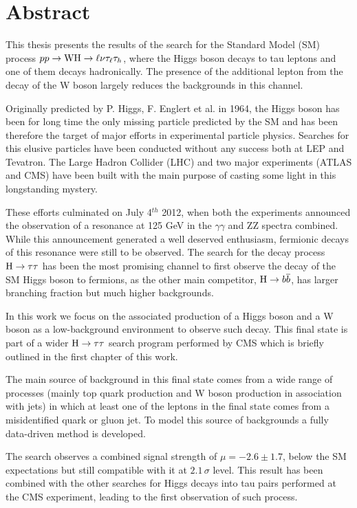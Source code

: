 \chapter*{Abstract}

This thesis presents the results of the search for the Standard Model (SM) process $pp \rightarrow \mathrm{W}\mathrm{H} \rightarrow \ell \nu \tau_\ell \tau_h$, where the Higgs boson decays to tau leptons and one of them decays hadronically. The presence of the additional lepton from the decay of the W boson largely reduces the backgrounds in this channel.

Originally predicted by P. Higgs, F. Englert et al. in 1964, the Higgs boson has been for long time the only missing particle predicted by the SM and has been therefore the target of major efforts in experimental particle physics. Searches for this elusive particles have been conducted without any success both at LEP and Tevatron. The Large Hadron Collider (LHC) and two major experiments (ATLAS and CMS) have been built with the main purpose of casting some light in this longstanding mystery. 

These efforts culminated on July 4$^{th}$ 2012, when both the experiments announced the observation of a resonance at 125 GeV in the $\gamma \gamma$ and ZZ spectra combined. While this announcement generated a well deserved enthusiasm, fermionic decays of this resonance were still to be observed. The search for the decay process $\mathrm{H} \rightarrow \tau \tau$ has been the most promising channel to first observe the decay of the SM Higgs boson to fermions, as the other main competitor, $\mathrm{H} \rightarrow b\overline{b}$, has larger branching fraction but much higher backgrounds. 

In this work we focus on the associated production of a Higgs boson and a W boson as a low-background environment to observe such decay. This final state is part of a wider $\mathrm{H} \rightarrow \tau \tau$ search program performed by CMS which is briefly outlined in the first chapter of this work. 

The main source of background in this final state comes from a wide range of processes (mainly top quark production and W boson production in association with jets) in which at least one of the leptons in the final state comes from a misidentified quark or gluon jet. To model this source of backgrounds a fully data-driven method %
is developed.

The search observes a combined signal strength of $\mu = -2.6\pm1.7$,  below the SM expectations but still compatible with it at $2.1\,\sigma$ level. This result has been combined with the other searches for Higgs decays into tau pairs performed at the CMS experiment, leading to the first observation of such process.
